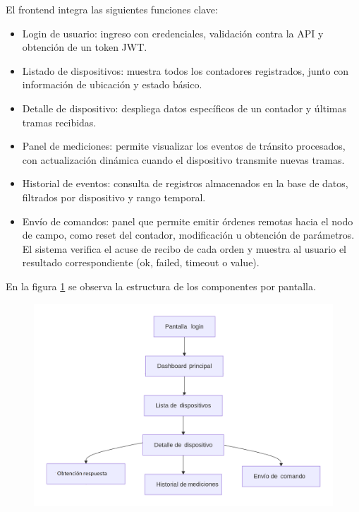 El frontend integra las siguientes funciones clave:
\begin{itemize}
    \item Login de usuario: ingreso con credenciales, validación contra la API y obtención de un token JWT.
    \item Listado de dispositivos: muestra todos los contadores registrados, junto con información de ubicación y estado básico.
    \item Detalle de dispositivo: despliega datos específicos de un contador y últimas tramas recibidas.
    \item Panel de mediciones: permite visualizar los eventos de tránsito procesados, con actualización dinámica cuando el dispositivo transmite nuevas tramas.
    \item Historial de eventos: consulta de registros almacenados en la base de datos, filtrados por dispositivo y rango temporal.
    \item Envío de comandos: panel que permite emitir órdenes remotas hacia el nodo de campo, como reset del contador, modificación u obtención de parámetros. El sistema verifica el acuse de recibo de cada orden y muestra al usuario el resultado correspondiente (ok, failed, timeout o value).   
\end{itemize}
\pagebreak
En la figura \ref{fig:diagrama_front_pantallas} se observa la estructura de los componentes por pantalla.
\begin{figure}[H]
 
  \centering
  \includegraphics[width=0.8\linewidth]{./Figures/diagEstructuraComponentesPantallasFrontend.png}
  \label{fig:diagrama_front_pantallas}
\end{figure}



